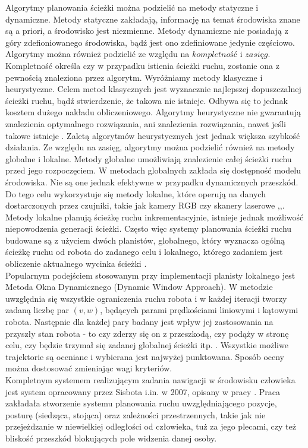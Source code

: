\indent Algorytmy planowania ścieżki można podzielić na metody statyczne i dynamiczne. Metody statyczne zakładają, informację na temat środowiska znane są a priori, a środowisko jest niezmienne. Metody dynamiczne nie posiadają z góry zdefioniowanego środowiska, bądź jest ono zdefiniowane jedynie częściowo. Algorytmy można również podzielić ze względu na $kompletność$ i $zasięg$. Kompletność określa czy w przypadku istienia ścieżki ruchu, zostanie ona z pewnością znaleziona przez algorytm. Wyróżniamy metody klasyczne i heurystyczne. Celem metod klasycznych jest wyznacznie najlepszej dopuszczalnej ścieżki ruchu, bądź stwierdzenie, że takowa nie istnieje. Odbywa się to jednak kosztem dużego nakładu obliczeniowego. Algorytmy heurystyczne nie gwarantują znalezienia optymalnego rozwiązania, ani znalezienia rozwiązania, nawet jeśli takowe istnieje \cite{planer_1}. Zaletą algorytmów heurystycznych jest jednak większa szybkość działania. Ze względu na zasięg, algorytmy można podzielić również na metody globalne i lokalne. Metody globalne umożliwiają znalezienie całej ścieżki ruchu przed jego rozpoczęciem. W metodach globalnych zakłada się dostępność modelu środowiska. Nie są one jednak efektywne w przypadku dynamicznych przeszkód. Do tego celu wykorzystuje się metody lokalne, które operują na danych dostarczonych przez czujniki, takie jak kamery RGB czy skanery laserowe \cite{taxonomy},\cite{planer_1},\cite{planer_2}. Metody lokalne planują ścieżkę ruchu inkrementacyjnie, istnieje jednak możliwość niepowodzenia generacji ścieżki. Często więc systemy planowania ścieżki ruchu budowane są z użyciem dwóch planistów, globalnego, który wyznacza ogólną ścieżkę ruchu od robota do zadanego celu i lokalnego, którego zadaniem jest obliczenie aktualnego wycinka ścieżki \cite{taxonomy}. \\
\indent Popularnym podejściem stosowanym przy implementacji planisty lokalnego jest Metoda Okna Dynamicznego (Dynamic Window Approach). W metodzie uwzględnia się wszystkie ograniczenia ruchu robota i w każdej iteracji tworzy zadaną liczbę par $(v,w)$, będących parami prędkościami liniowymi i kątowymi robota. Następnie dla każdej pary badany jest wpływ jej zastosowania na przyszły stan robota - to czy zderzy się on z przeszkodą, czy podąży w stronę celu, czy będzie trzymał się zadanej globalnej ścieżki itp. \cite{dwa}. Wszystkie możliwe trajektorie są oceniane i wybierana jest najwyżej punktowana. Sposób oceny można dostosować zmieniając wagi kryteriów.\\
\indent Kompletnym systemem realizującym zadania nawigacji w środowisku człowieka jest system opracowany przez Sisbota i.in. w 2007, opisany w pracy \cite{ma}. Praca zakładała stworzenie systemu planowania ruchu uwzględniającego pozycje, posturę (siedząca, stojąca) oraz zależności przestrzennych, takie jak nie przejeżdzanie w niewielkiej odległości od człowieka, tuż za jego plecami, czy też bliskość przeszkód blokujących pole widzenia danej osoby. 

